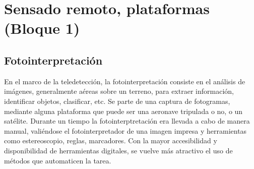 \color{cyan} %
\section{Sensado remoto, plataformas (Bloque 1)}
\subsection{Fotointerpretación}
En el marco de la teledetección, la fotointerpretación consiste en el análisis de imágenes, generalmente aéreas sobre un terreno, para extraer información, identificar objetos, clasificar, etc. Se parte de una captura de fotogramas, mediante alguna plataforma que puede ser una aeronave tripulada o no, o un satélite. Durante un tiempo la fotointerptretación era llevada a cabo de manera manual, valiéndose el fotointerpretador de una imagen impresa y herramientas como estereoscopio, reglas, marcadores. Con la mayor accesibilidad y disponibilidad de herramientas digitales, se vuelve más atractivo el uso de métodos que automaticen la tarea.

